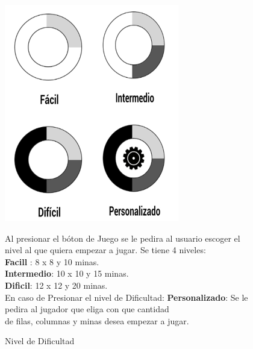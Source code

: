 \begin{figure}[htbp]
\begin{center}
\includegraphics[width=.70\textwidth]{./imagenes/Niveles.png}
\caption{Nivel de Dificultad}
\label{Nivel de Dificultad}
\end{center}
Al presionar el bóton de Juego se le pedira al usuario escoger el nivel al que quiera empezar a jugar. Se tiene 4 niveles:
\\ \textbf{Facill} : 8 x 8  y 10 minas.
\\ \textbf{Intermedio}: 10 x 10 y 15 minas.
\\ \textbf{Dificil}: 12 x 12 y 20 minas.
\\En caso de Presionar el nivel de Dificultad: \textbf{Personalizado}: Se le pedira al jugador que eliga con que cantidad 
\\de filas, columnas y minas desea empezar a jugar.  
\end{figure} 
\ \\ \ \\ \ \\ \ \\

